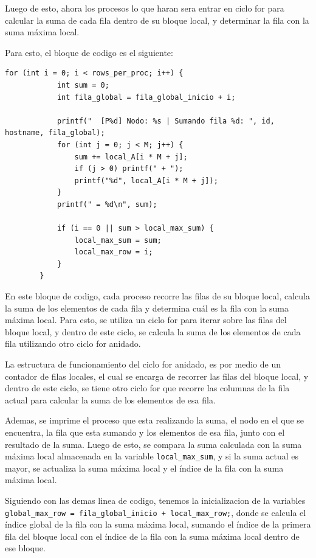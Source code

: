 \documentclass[letterpaper,11pt]{article}
\begin{document}
    Luego de esto, ahora los procesos lo que haran sera entrar en ciclo for para calcular la suma de cada fila dentro de su bloque local, y determinar la fila con la suma máxima local.
    
    Para esto, el bloque de codigo es el siguiente:

    \begin{lstlisting}[style=cstyle,caption={Calculo de suma de filas y determinacion de fila con suma maxima local},label={lst:programa-b}]
        for (int i = 0; i < rows_per_proc; i++) {
            int sum = 0;
            int fila_global = fila_global_inicio + i;

            printf("  [P%d] Nodo: %s | Sumando fila %d: ", id, hostname, fila_global);
            for (int j = 0; j < M; j++) {
                sum += local_A[i * M + j];
                if (j > 0) printf(" + ");
                printf("%d", local_A[i * M + j]);
            }
            printf(" = %d\n", sum);

            if (i == 0 || sum > local_max_sum) {
                local_max_sum = sum;
                local_max_row = i;
            }
        }
    \end{lstlisting}

    En este bloque de codigo, cada proceso recorre las filas de su bloque local, calcula la suma de los elementos de cada fila y determina cuál es la fila con la suma máxima local.
    Para esto, se utiliza un ciclo for para iterar sobre las filas del bloque local, y dentro de este ciclo, se calcula la suma de los elementos de cada fila utilizando otro ciclo for anidado.

    La estructura de funcionamiento del ciclo for anidado, es por medio de un contador de filas locales, el cual se encarga de recorrer las filas del bloque local, y dentro de este ciclo, se tiene otro ciclo for que recorre las columnas de la fila actual para calcular la suma de los elementos de esa fila.
    
    Ademas, se imprime el proceso que esta realizando la suma, el nodo en el que se encuentra, la fila que esta sumando y los elementos de esa fila, junto con el resultado de la suma.
    Luego de esto, se compara la suma calculada con la suma máxima local almacenada en la variable \texttt{local\_max\_sum}, y si la suma actual es mayor, se actualiza la suma máxima local y el índice de la fila con la suma máxima local.
    
    Siguiendo con las demas linea de codigo, tenemos la inicializacion de la variables \texttt{global\_max\_row = fila\_global\_inicio + local\_max\_row;}, donde se calcula el índice global de la fila con la suma máxima local, sumando el índice de la primera fila del bloque local con el índice de la fila con la suma máxima local dentro de ese bloque.
    
\end{document}
